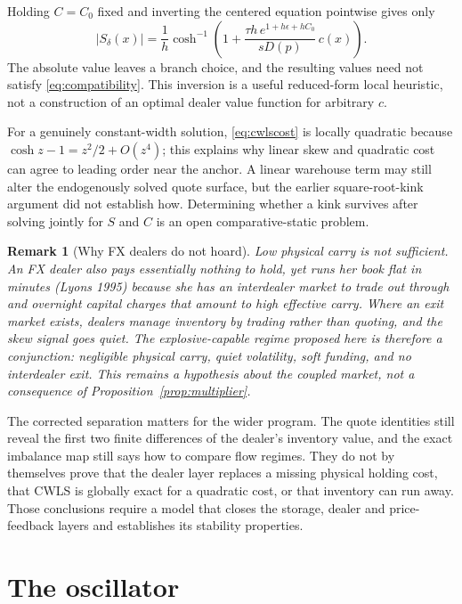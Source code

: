 \documentclass[11pt]{article}
\newtheorem{remark}{Remark}
\begin{document}
Holding $C=C_0$ fixed and inverting the centered equation pointwise gives only
\[
\left|S_\delta(x)\right|
=\frac1h\cosh^{-1}\!\left(
1+\frac{\tau h\,e^{1+h\epsilon+hC_0}}{sD(p)}\,c(x)
\right).
\]
The absolute value leaves a branch choice, and the resulting values need not satisfy
\eqref{eq:compatibility}. This inversion is a useful reduced-form local heuristic, not a construction of an optimal dealer value function for arbitrary $c$.

For a genuinely constant-width solution, \eqref{eq:cwlscost} is locally quadratic because
$\cosh z-1=z^2/2+O(z^4)$; this explains why linear skew and quadratic cost can agree to leading order near the anchor. A linear warehouse term may still alter the endogenously solved quote surface, but the earlier square-root-kink argument did not establish how. Determining whether a kink survives after solving jointly for $S$ and $C$ is an open comparative-static problem.

\begin{remark}[Why FX dealers do not hoard]
Low physical carry is not sufficient. An FX dealer also pays essentially nothing to hold, yet runs her book flat in minutes (Lyons 1995) because she has an interdealer market to trade out through and overnight capital charges that amount to high effective carry. Where an exit market exists, dealers manage inventory by trading rather than quoting, and the skew signal goes quiet. The explosive-capable regime proposed here is therefore a conjunction: negligible physical carry, quiet volatility, soft funding, and \emph{no interdealer exit}. This remains a hypothesis about the coupled market, not a consequence of Proposition~\ref{prop:multiplier}.
\end{remark}

The corrected separation matters for the wider program. The quote identities still reveal the first two finite differences of the dealer's inventory value, and the exact imbalance map still says how to compare flow regimes. They do not by themselves prove that the dealer layer replaces a missing physical holding cost, that CWLS is globally exact for a quadratic cost, or that inventory can run away. Those conclusions require a model that closes the storage, dealer and price-feedback layers and establishes its stability properties.

\section{The oscillator}\label{sec:oscillator}
\end{document}
